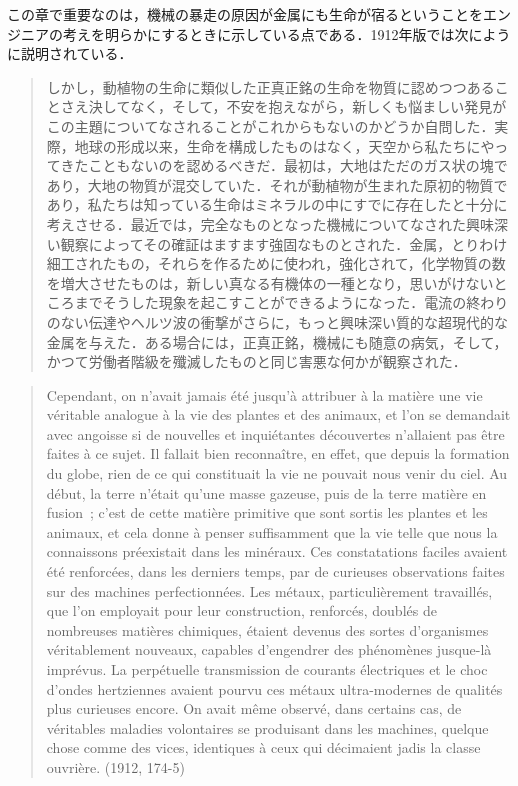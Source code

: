 この章で重要なのは，機械の暴走の原因が金属にも生命が宿るということをエンジニアの考えを明らかにするときに示している点である．1912年版では次にように説明されている．
\begin{quote}
しかし，動植物の生命に類似した正真正銘の生命を物質に認めつつあることさえ決してなく，そして，不安を抱えながら，新しくも悩ましい発見がこの主題についてなされることがこれからもないのかどうか自問した．実際，地球の形成以来，生命を構成したものはなく，天空から私たちにやってきたこともないのを認めるべきだ．最初は，大地はただのガス状の塊であり，大地の物質が混交していた．それが動植物が生まれた原初的物質であり，私たちは知っている生命はミネラルの中にすでに存在したと十分に考えさせる．最近では，完全なものとなった機械についてなされた興味深い観察によってその確証はますます強固なものとされた．金属，とりわけ細工されたもの，それらを作るために使われ，強化されて，化学物質の数を増大させたものは，新しい真なる有機体の一種となり，思いがけないところまでそうした現象を起こすことができるようになった．電流の終わりのない伝達やヘルツ波の衝撃がさらに，もっと興味深い質的な超現代的な金属を与えた．ある場合には，正真正銘，機械にも随意の病気，そして，かつて労働者階級を殲滅したものと同じ害悪な何かが観察された．
\end{quote}
\begin{quote}
Cependant, on n'avait jamais été jusqu'à attribuer à la matière une vie véritable analogue à la vie des plantes et des animaux, et l'on se demandait avec angoisse si de nouvelles et inquiétantes découvertes n'allaient pas être faites à ce sujet. Il fallait bien reconnaître, en effet, que depuis la formation du globe, rien de ce qui constituait la vie ne pouvait nous venir du ciel. Au début, la terre n'était qu'une masse gazeuse, puis de la terre matière en fusion~; c'est de cette matière primitive que sont sortis les plantes et les animaux, et cela donne à penser suffisamment que la vie telle que nous la connaissons préexistait dans les minéraux. Ces constatations faciles avaient été renforcées, dans les derniers temps, par de curieuses observations faites sur des machines perfectionnées. Les métaux, particulièrement travaillés, que l'on employait pour leur construction, renforcés, doublés de nombreuses matières chimiques, étaient devenus des sortes d'organismes véritablement nouveaux, capables d'engendrer des phénomènes jusque-là imprévus. La perpétuelle transmission de courants électriques et le choc d'ondes hertziennes avaient pourvu ces métaux ultra-modernes de qualités plus curieuses encore. On avait même observé, dans certains cas, de véritables maladies volontaires se produisant dans les machines, quelque chose comme des vices, identiques à ceux qui décimaient jadis la classe ouvrière. (1912, 174-5)
\end{quote}
